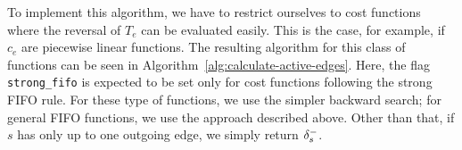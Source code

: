 To implement this algorithm, we have to restrict ourselves to cost functions where the reversal of $T_e$ can be evaluated easily.
This is the case, for example, if $c_e$ are piecewise linear functions.
The resulting algorithm for this class of functions can be seen in Algorithm~\ref{alg:calculate-active-edges}.
Here, the flag \texttt{strong\_fifo} is expected to be set only for cost functions following the strong FIFO rule.
For these type of functions, we use the simpler backward search; for  general FIFO functions, we use the approach described above.
Other than that, if $s$ has only up to one outgoing edge, we simply return $\delta^-_{s}$.

